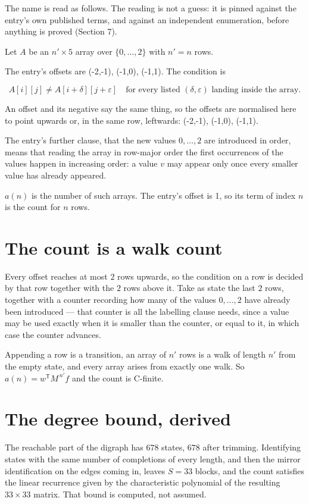 \documentclass[11pt]{article}
\theoremstyle{definition}
\begin{document}
The name is read as follows. The reading is not a guess: it is pinned against the entry's own published terms, and against an independent enumeration, before anything is proved (Section 7).

Let $A$ be an $n' \times 5$ array over $\{0,\dots,2\}$ with $n' = n$ rows.

The entry's offsets are (-2,-1), (-1,0), (-1,1). The condition is

\[A[i][j] \ne A[i{+}\delta][j{+}\varepsilon]\quad\text{for every listed }(\delta,\varepsilon)\text{ landing inside the array.}\]

An offset and its negative say the same thing, so the offsets are normalised here to point upwards or, in the same row, leftwards: (-2,-1), (-1,0), (-1,1).

The entry's further clause, that the new values $0,\dots,2$ are introduced in order, means that reading the array in row-major order the first occurrences of the values happen in increasing order: a value $v$ may appear only once every smaller value has already appeared.

$a(n)$ is the number of such arrays. The entry's offset is 1, so its term of index $n$ is the count for $n$ rows.

\section{The count is a walk count}

Every offset reaches at most $2$ rows upwards, so the condition on a row is decided by that row together with the $2$ rows above it. Take as state the last $2$ rows, together with a counter recording how many of the values $0,\dots,2$ have already been introduced --- that counter is all the labelling clause needs, since a value may be used exactly when it is smaller than the counter, or equal to it, in which case the counter advances.

Appending a row is a transition, an array of $n'$ rows is a walk of length $n'$ from the empty state, and every array arises from exactly one walk. So $a(n) = w^{\mathsf T}M^{\,n'}f$ and the count is C-finite.

\section{The degree bound, derived}

The reachable part of the digraph has $678$ states, $678$ after trimming. Identifying states with the same number of completions of every length, and then the mirror identification on the edges coming in, leaves $S = 33$ blocks, and the count satisfies the linear recurrence given by the characteristic polynomial of the resulting $33\times33$ matrix. That bound is computed, not assumed.
\end{document}
